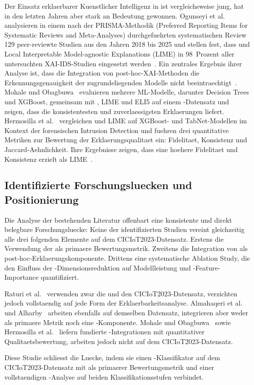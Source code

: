 Der Einsatz erklaerbarer Kuenstlicher Intelligenz in \ids{} ist vergleichsweise jung,
hat in den letzten Jahren aber stark an Bedeutung gewonnen.
Ogunseyi et al.\ \cite{ogunseyi2026xai_review} analysieren in einem nach der PRISMA-Methodik
(Preferred Reporting Items for Systematic Reviews and Meta-Analyses) durchgefuehrten
systematischen Review 129 peer-reviewte Studien aus den Jahren 2018 bis 2025 und stellen fest,
dass \shap{} und Local Interpretable Model-agnostic Explanations (LIME) in 98~Prozent aller
untersuchten XAI-IDS-Studien eingesetzt werden~\cite{ogunseyi2026xai_review}.
Ein zentrales Ergebnis ihrer Analyse ist, dass die Integration von post-hoc-XAI-Methoden die
Erkennungsgenauigkeit der zugrundeliegenden Modelle nicht beeintraechtigt~\cite{ogunseyi2026xai_review}.
Mohale und Obagbuwa~\cite{mohale2025xai} evaluieren mehrere ML-Modelle, darunter Decision Trees
und XGBoost, gemeinsam mit \shap{}, LIME und ELI5 auf einem \ids{}-Datensatz und zeigen, dass
\shap{} die konsistentesten und zuverlaessigsten Erklaerungen liefert.
Hermosilla et al.\ \cite{hermosilla2025xai_forensic} vergleichen \shap{} und LIME auf
XGBoost- und TabNet-Modellen im Kontext der forensischen Intrusion Detection und fuehren drei
quantitative Metriken zur Bewertung der Erklaerungsqualitaet ein: Fidelitaet, Konsistenz und
Jaccard-Aehnlichkeit.
Ihre Ergebnisse zeigen, dass \shap{} eine hoehere Fidelitaet und Konsistenz erzielt als
LIME~\cite{hermosilla2025xai_forensic}.

\subsection{Identifizierte Forschungsluecken und Positionierung}

Die Analyse der bestehenden Literatur offenbart eine konsistente und direkt belegbare
Forschungsluecke: Keine der identifizierten Studien vereint gleichzeitig alle drei folgenden
Elemente auf dem CICIoT2023-Datensatz.
Erstens die Verwendung der \ba{} als primaere Bewertungsmetrik.
Zweitens die Integration von \shap{} als post-hoc-Erklaerungskomponente.
Drittens eine systematische Ablation Study, die den Einfluss der \pca{}-Dimensionsreduktion
auf Modellleistung und \shap{}-Feature-Importance quantifiziert.

Raturi et al.\ \cite{raturi2026exploratory} verwenden zwar die \ba{} und den
CICIoT2023-Datensatz, verzichten jedoch vollstaendig auf jede Form der
Erklaerbarkeitsanalyse.
Almahaqeri et al.\ \cite{almahaqeri2026gradient} und Alharby~\cite{alharby2025ciciot} arbeiten
ebenfalls auf demselben Datensatz, integrieren aber weder \ba{} als primaere Metrik noch eine
\shap{}-Komponente.
Mohale und Obagbuwa~\cite{mohale2025xai} sowie Hermosilla et al.\ \cite{hermosilla2025xai_forensic}
liefern fundierte \shap{}-Integrationen mit quantitativer Qualitaetsbewertung, arbeiten
jedoch nicht auf dem CICIoT2023-Datensatz.

Diese Studie schliesst die Luecke, indem sie einen \gb{}-Klassifikator auf dem
CICIoT2023-Datensatz mit \ba{} als primaerer Bewertungsmetrik und einer vollstaendigen
\shap{}-Analyse auf beiden Klassifikationsstufen verbindet.
